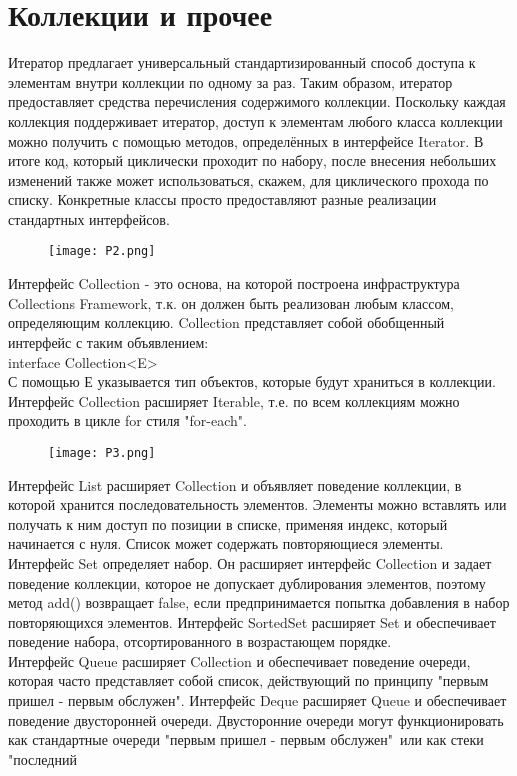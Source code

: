 {\section{Коллекции и прочее}
Итератор предлагает универсальный стандартизированный способ доступа к элементам внутри коллекции по одному за раз. Таким образом, итератор предоставляет средства перечисления содержимого коллекции. Поскольку каждая коллекция поддерживает итератор, доступ к элементам любого класса коллекции можно получить с помощью методов, определённых в интерфейсе Iterator. В итоге код, который циклически проходит по набору, после внесения небольших изменений также может использоваться, скажем, для циклического прохода по списку. Конкретные
классы просто предоставляют разные реализации стандартных интерфейсов. 
\begin{figure}[H]
    \centering
    \texttt{[image: P2.png]}
\end{figure}
\noindent Интерфейс Collection - это основа, на которой построена инфраструктура Collections Framework, т.к. он должен быть реализован любым классом, определяющим коллекцию. Collection представляет собой обобщенный интерфейс с таким объявлением: \\
interface Collection<E> \\
С помощью Е указывается тип объектов, которые будут храниться в коллекции. Интерфейс Collection расширяет Iterable, т.е. по всем коллекциям можно проходить в цикле for стиля "for-each".
\begin{figure}[H]
    \centering
    \texttt{[image: P3.png]}
\end{figure}
\noindent Интерфейс List расширяет Collection и объявляет поведение коллекции, в которой хранится последовательность элементов. Элементы можно вставлять или получать к ним доступ по позиции в списке, применяя индекс, который начинается с нуля. Список может содержать повторяющиеся элементы. \\
Интерфейс Set определяет набор. Он расширяет интерфейс Collection и задает поведение коллекции, которое не допускает дублирования элементов, поэтому метод add() возвращает false, если предпринимается попытка добавления в набор повторяющихся элементов. Интерфейс SortedSet расширяет Set и обеспечивает поведение набора, отсортированного в возрастающем порядке. \\
Интерфейс Queue расширяет Collection и обеспечивает поведение очереди, которая часто представляет собой список, действующий по принципу "первым пришел - первым обслужен". Интерфейс Deque расширяет Queue и обеспечивает поведение двусторонней очереди. Двусторонние очереди могут функционировать как стандартные очереди "первым пришел - первым обслужен"\, или как стеки "последний
}
